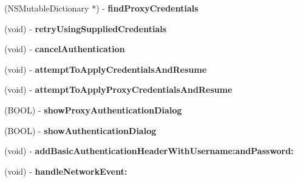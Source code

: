 \begin{DoxyCompactItemize}
\item 
\hypertarget{interface_a_s_i_h_t_t_p_request_aee0699cfb5ba5749a1461dfa56440121}{
(\-N\-S\-Mutable\-Dictionary $\ast$) -\/ {\bfseries find\-Proxy\-Credentials}}
\label{interface_a_s_i_h_t_t_p_request_aee0699cfb5ba5749a1461dfa56440121}

\item 
\hypertarget{interface_a_s_i_h_t_t_p_request_aad1efa3b1bc64006cc033bd0d4eee7cc}{
(void) -\/ {\bfseries retry\-Using\-Supplied\-Credentials}}
\label{interface_a_s_i_h_t_t_p_request_aad1efa3b1bc64006cc033bd0d4eee7cc}

\item 
\hypertarget{interface_a_s_i_h_t_t_p_request_a25d3d77f917c5f8b9956f6a45022dae2}{
(void) -\/ {\bfseries cancel\-Authentication}}
\label{interface_a_s_i_h_t_t_p_request_a25d3d77f917c5f8b9956f6a45022dae2}

\item 
\hypertarget{interface_a_s_i_h_t_t_p_request_ad3da0a488faf41101bbf73a8071456e8}{
(void) -\/ {\bfseries attempt\-To\-Apply\-Credentials\-And\-Resume}}
\label{interface_a_s_i_h_t_t_p_request_ad3da0a488faf41101bbf73a8071456e8}

\item 
\hypertarget{interface_a_s_i_h_t_t_p_request_a03ce363e92c2d5dbe7229f021b0230a5}{
(void) -\/ {\bfseries attempt\-To\-Apply\-Proxy\-Credentials\-And\-Resume}}
\label{interface_a_s_i_h_t_t_p_request_a03ce363e92c2d5dbe7229f021b0230a5}

\item 
\hypertarget{interface_a_s_i_h_t_t_p_request_ad9c4b7b0abc790e74806860c6d7a7a5b}{
(\-B\-O\-O\-L) -\/ {\bfseries show\-Proxy\-Authentication\-Dialog}}
\label{interface_a_s_i_h_t_t_p_request_ad9c4b7b0abc790e74806860c6d7a7a5b}

\item 
\hypertarget{interface_a_s_i_h_t_t_p_request_a64d812546f152b29ddd614938ffa5539}{
(\-B\-O\-O\-L) -\/ {\bfseries show\-Authentication\-Dialog}}
\label{interface_a_s_i_h_t_t_p_request_a64d812546f152b29ddd614938ffa5539}

\item 
\hypertarget{interface_a_s_i_h_t_t_p_request_a0295b7fbbc9af2be76f9dfe06f75f1ca}{
(void) -\/ {\bfseries add\-Basic\-Authentication\-Header\-With\-Username\-:and\-Password\-:}}
\label{interface_a_s_i_h_t_t_p_request_a0295b7fbbc9af2be76f9dfe06f75f1ca}

\item 
\hypertarget{interface_a_s_i_h_t_t_p_request_a271ec6e669cafa5063866022fb3577ba}{
(void) -\/ {\bfseries handle\-Network\-Event\-:}}
\label{interface_a_s_i_h_t_t_p_request_a271ec6e669cafa5063866022fb3577ba}


\end{DoxyCompactItemize}
